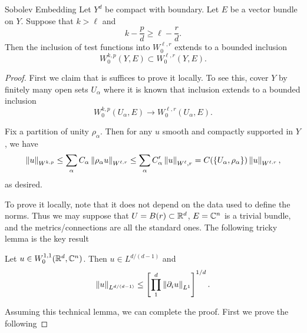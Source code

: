 \begin{clear}{Sobolev Embedding}
  Let $Y^{d}$ be compact with boundary. Let $E$ be a vector bundle on $Y$. Suppose that $k>\ell$ and
  \begin{equation*}
    k-\frac{p}{d}\ge \ell-\frac{r}{d}.
  \end{equation*}
  Then the inclusion of test functions into $W^{\ell,r}_{0}$ extends to a bounded inclusion
  \begin{equation*}
    W^{k,p}_{0}(Y,E)\subset W^{\ell,r}_{0}(Y,E).
  \end{equation*}
\end{clear}
\begin{proof}
  First we claim that is suffices to prove it locally. To see this, cover $Y$ by finitely many open sets $U_{\alpha}$ where it is known that inclusion extends to a bounded inclusion $$W^{k,p}_{0}(U_{\alpha},E)\to W^{\ell,r}_{0}(U_{\alpha},E).$$

  Fix a partition of unity $\rho_{\alpha}$. Then for any $u$ smooth and compactly supported in $Y$, we have
  \begin{equation*}
    \left\lVert u\right\rVert_{W^{k,p}}\le \sum_{\alpha} C_{\alpha}\left\lVert\rho_{\alpha}u\right\rVert_{W^{\ell,r}}\le \sum_{\alpha}C_{\alpha}'\left\lVert u\right\rVert_{W^{\ell},r}=C(\left\{U_{\alpha},\rho_{\alpha}\right\})\left\lVert u\right\rVert_{W^{\ell,r}},
  \end{equation*}
  as desired.

  To prove it locally, note that it does not depend on the data used to define the norms. Thus we may suppose that $U=B(r)\subset \mathbb{R}^{d}$, $E=\mathbb{C}^{n}$ is a trivial bundle, and the metrics/connections are all the standard ones. The following tricky lemma is the key result
  \begin{lemma}
    Let $u\in W^{1,1}_{0}(\mathbb{R}^{d},\mathbb{C}^{n})$. Then $u\in L^{d/(d-1)}$ and
    \begin{equation*}
      \left\lVert u\right\rVert_{L^{d/(d-1)}}\le \left[\prod_{1}^{d}\left\lVert\partial_{i}u\right\rVert_{L^{1}}\right]^{1/d}.
    \end{equation*}
  \end{lemma}
  Assuming this technical lemma, we can complete the proof. First we prove the following


\end{proof}
